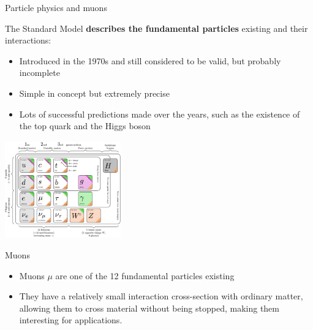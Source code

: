\documentclass[8 pt]{beamer}
\begin{document}
\begin{frame}{Particle physics and muons}

\begin{minipage}[c]{.54\textwidth}
The Standard Model \textbf{describes the fundamental particles} existing and their interactions:
\begin{itemize}
	\justifying
	\item Introduced in the 1970s and still considered to be valid, but probably incomplete
	\item Simple in concept but extremely precise
	\item Lots of successful predictions made over the years, such as the existence of the top quark and the Higgs boson
\end{itemize}
\end{minipage} \hfill
\begin{minipage}[c]{.42\textwidth}
	\includegraphics[width=5cm, height=4.2cm]{figs/SMFermions.png}
\end{minipage} \hfill \vfill

\begin{exampleblock}{} Muons \end{exampleblock}
\begin{itemize}
	\justifying
	\item Muons $\mu$ are one of the 12 fundamental particles existing
	\item They have a relatively small interaction cross-section with ordinary matter, allowing them to cross material without being stopped, making them interesting for applications.
\end{itemize} \vfill
\end{frame}
\end{document}
